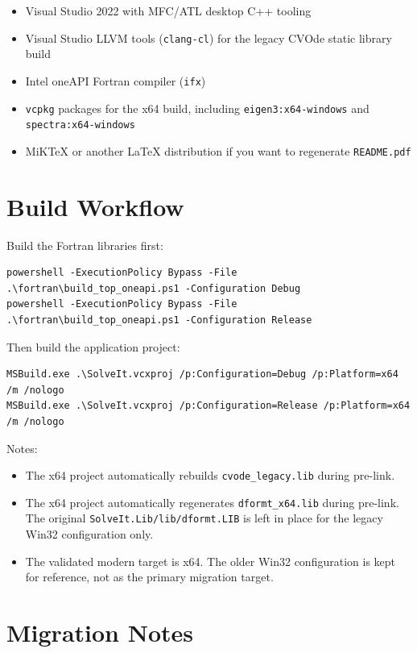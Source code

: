 \documentclass[11pt]{article}
\begin{document}
\begin{itemize}[leftmargin=*]
\item Visual Studio 2022 with MFC/ATL desktop C++ tooling
\item Visual Studio LLVM tools (\texttt{clang-cl}) for the legacy CVOde static library build
\item Intel oneAPI Fortran compiler (\texttt{ifx})
\item \texttt{vcpkg} packages for the x64 build, including \texttt{eigen3:x64-windows} and \texttt{spectra:x64-windows}
\item MiKTeX or another LaTeX distribution if you want to regenerate \texttt{README.pdf}
\end{itemize}

\section*{Build Workflow}

Build the Fortran libraries first:

\begin{verbatim}
powershell -ExecutionPolicy Bypass -File .\fortran\build_top_oneapi.ps1 -Configuration Debug
powershell -ExecutionPolicy Bypass -File .\fortran\build_top_oneapi.ps1 -Configuration Release
\end{verbatim}

Then build the application project:

\begin{verbatim}
MSBuild.exe .\SolveIt.vcxproj /p:Configuration=Debug /p:Platform=x64 /m /nologo
MSBuild.exe .\SolveIt.vcxproj /p:Configuration=Release /p:Platform=x64 /m /nologo
\end{verbatim}

Notes:

\begin{itemize}[leftmargin=*]
\item The x64 project automatically rebuilds \texttt{cvode\_legacy.lib} during pre-link.
\item The x64 project automatically regenerates \texttt{dformt\_x64.lib} during pre-link. The original \texttt{SolveIt.Lib/lib/dformt.LIB} is left in place for the legacy Win32 configuration only.
\item The validated modern target is x64. The older Win32 configuration is kept for reference, not as the primary migration target.
\end{itemize}

\section*{Migration Notes}
\end{document}
